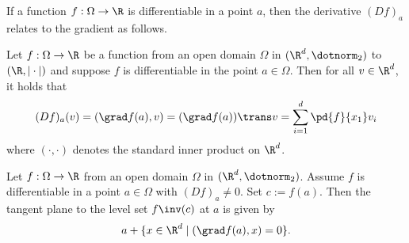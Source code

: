 If a function $f: \Omega \to \R$ is differentiable in a point $a$, then the derivative $(Df)_a$ relates to the gradient as follows.
\begin{proposition}
    Let $f:\Omega \to \R$ be a function from an open domain $\Omega$ in $(\R^d, \dotnorm_2)$ to $(\R,|\cdot|)$ and suppose $f$ is differentiable in the point $a \in \Omega$.
    Then for all $v \in \R^d$, it holds that
    $$(Df)_a(v) = (\grad f(a),v) = (\grad f(a))\trans v = \sum_{i=1}^d\pd{f}{x_1}v_i$$
    where $(\cdot,\cdot)$ denotes the standard inner product on $\R^d$.
\end{proposition}

\begin{proposition}
    Let $f:\Omega \to \R$ from an open domain $\Omega$ in $(\R^d,\dotnorm_2)$. Assume $f$ is differentiable in a point 
    $a \in \Omega$ with $(Df)_a \ne 0$. Set $c:=f(a)$. Then the tangent plane to the level set $f\inv(c)$ at $a$ is given by
    $$a + \{x \in \R^d \mid (\grad f(a), x) = 0\}.$$
\end{proposition}
